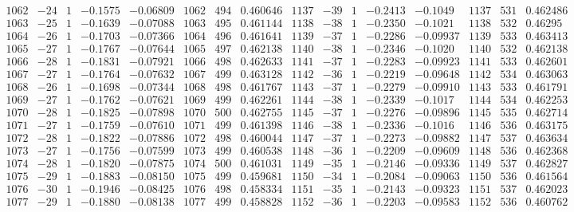 \documentclass[11pt,reqno,a4letter]{article}
\numberwithin{figure}{section}
\numberwithin{table}{section}
\theoremstyle{plain}
\numberwithin{theorem}{section}
\theoremstyle{definition}
\begin{document}
\begin{table}[ht]
\begin{equation*}
{\begin{array}{ccccc|ccc|ccccc|ccc}
 1062 & -24 & 1 & -0.1575 & -0.06809 & 1062 & 494 & 0.460646 & 1137 & -39 & 1 & -0.2413 & -0.1049 & 1137 & 531 & 0.462486 \\
 1063 & -25 & 1 & -0.1639 & -0.07088 & 1063 & 495 & 0.461144 & 1138 & -38 & 1 & -0.2350 & -0.1021 & 1138 & 532 & 0.46295 \\
 1064 & -26 & 1 & -0.1703 & -0.07366 & 1064 & 496 & 0.461641 & 1139 & -37 & 1 & -0.2286 & -0.09937 & 1139 & 533 & 0.463413 \\
 1065 & -27 & 1 & -0.1767 & -0.07644 & 1065 & 497 & 0.462138 & 1140 & -38 & 1 & -0.2346 & -0.1020 & 1140 & 532 & 0.462138 \\
 1066 & -28 & 1 & -0.1831 & -0.07921 & 1066 & 498 & 0.462633 & 1141 & -37 & 1 & -0.2283 & -0.09923 & 1141 & 533 & 0.462601 \\
 1067 & -27 & 1 & -0.1764 & -0.07632 & 1067 & 499 & 0.463128 & 1142 & -36 & 1 & -0.2219 & -0.09648 & 1142 & 534 & 0.463063 \\
 1068 & -26 & 1 & -0.1698 & -0.07344 & 1068 & 498 & 0.461767 & 1143 & -37 & 1 & -0.2279 & -0.09910 & 1143 & 533 & 0.461791 \\
 1069 & -27 & 1 & -0.1762 & -0.07621 & 1069 & 499 & 0.462261 & 1144 & -38 & 1 & -0.2339 & -0.1017 & 1144 & 534 & 0.462253 \\
 1070 & -28 & 1 & -0.1825 & -0.07898 & 1070 & 500 & 0.462755 & 1145 & -37 & 1 & -0.2276 & -0.09896 & 1145 & 535 & 0.462714 \\
 1071 & -27 & 1 & -0.1759 & -0.07610 & 1071 & 499 & 0.461398 & 1146 & -38 & 1 & -0.2336 & -0.1016 & 1146 & 536 & 0.463175 \\
 1072 & -28 & 1 & -0.1822 & -0.07886 & 1072 & 498 & 0.460044 & 1147 & -37 & 1 & -0.2273 & -0.09882 & 1147 & 537 & 0.463634 \\
 1073 & -27 & 1 & -0.1756 & -0.07599 & 1073 & 499 & 0.460538 & 1148 & -36 & 1 & -0.2209 & -0.09609 & 1148 & 536 & 0.462368 \\
 1074 & -28 & 1 & -0.1820 & -0.07875 & 1074 & 500 & 0.461031 & 1149 & -35 & 1 & -0.2146 & -0.09336 & 1149 & 537 & 0.462827 \\
 1075 & -29 & 1 & -0.1883 & -0.08150 & 1075 & 499 & 0.459681 & 1150 & -34 & 1 & -0.2084 & -0.09063 & 1150 & 536 & 0.461564 \\
 1076 & -30 & 1 & -0.1946 & -0.08425 & 1076 & 498 & 0.458334 & 1151 & -35 & 1 & -0.2143 & -0.09323 & 1151 & 537 & 0.462023 \\
 1077 & -29 & 1 & -0.1880 & -0.08138 & 1077 & 499 & 0.458828 & 1152 & -36 & 1 & -0.2203 & -0.09583 & 1152 & 536 & 0.460762 \\

\end{array}}
\end{equation*}
\end{table}
\end{document}
